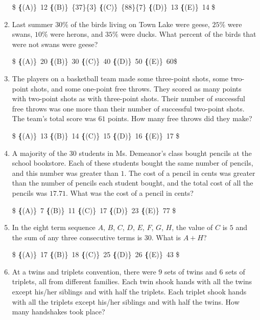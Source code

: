 \documentclass{article}
\begin{document}
\begin{enumerate}[label=\arabic*., itemsep=0.5em]
\$
\textbf\{(A)\}\ 12 \qquad
\textbf\{(B)\}\ \frac\{37\}\{3\} \qquad
\textbf\{(C)\}\ \frac\{88\}\{7\} \qquad
\textbf\{(D)\}\ 13 \qquad
\textbf\{(E)\}\ 14 \$\par \vspace{0.5em}\item Last summer $30\%$ of the birds living on Town Lake were geese, $25\%$ were swans, $10\%$ were herons, and $35\%$ were ducks. What percent of the birds that were not swans were geese?
 
\$
\textbf\{(A)\}\ 20 \qquad
\textbf\{(B)\}\ 30 \qquad
\textbf\{(C)\}\ 40 \qquad
\textbf\{(D)\}\ 50 \qquad
\textbf\{(E)\}\ 60\$\par \vspace{0.5em}\item The players on a basketball team made some three-point shots, some two-point shots, and some one-point free throws. They scored as many points with two-point shots as with three-point shots. Their number of successful free throws was one more than their number of successful two-point shots. The team's total score was $61$ points. How many free throws did they make?
 
\$
\textbf\{(A)\}\ 13 \qquad
\textbf\{(B)\}\ 14 \qquad
\textbf\{(C)\}\ 15 \qquad
\textbf\{(D)\}\ 16 \qquad
\textbf\{(E)\}\ 17 \$\par \vspace{0.5em}\item A majority of the $30$ students in Ms. Demeanor's class bought pencils at the school bookstore. Each of these students bought the same number of pencils, and this number was greater than $1$. The cost of a pencil in cents was greater than the number of pencils each student bought, and the total cost of all the pencils was $17.71$. What was the cost of a pencil in cents?

\$
\textbf\{(A)\}\ 7 \qquad
\textbf\{(B)\}\ 11 \qquad
\textbf\{(C)\}\ 17 \qquad
\textbf\{(D)\}\ 23 \qquad
\textbf\{(E)\}\ 77 \$\par \vspace{0.5em}\item In the eight term sequence $A$, $B$, $C$, $D$, $E$, $F$, $G$, $H$, the value of $C$ is $5$ and the sum of any three consecutive terms is $30$. What is $A+H$?

\$
\textbf\{(A)\}\ 17 \qquad
\textbf\{(B)\}\ 18 \qquad
\textbf\{(C)\}\ 25 \qquad
\textbf\{(D)\}\ 26 \qquad
\textbf\{(E)\}\ 43 \$\par \vspace{0.5em}\item At a twins and triplets convention, there were $9$ sets of twins and $6$ sets of triplets, all from different families. Each twin shook hands with all the twins except his/her siblings and with half the triplets. Each triplet shook hands with all the triplets except his/her siblings and with half the twins. How many handshakes took place?


\end{enumerate}
\end{document}
